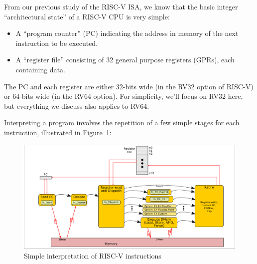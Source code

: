 \label{Sec_ISA_Exec_Algorithm}


From our previous study of the RISC-V ISA, we know that the basic
integer ``architectural state'' of a RISC-V CPU is very simple:

\begin{itemize}

\item A ``program counter'' (PC) indicating the address in memory of
the next instruction to be executed.

\item A ``register file'' consisting of 32 general purpose registers
(GPRs), each containing data.

\end{itemize}

The PC and each register are either 32-bits wide (in the RV32 option
of RISC-V) or 64-bits wide (in the RV64 option).  For simplicity,
we'll focus on RV32 here, but everything we discuss also applies to
RV64.

Interpreting a program involves the repetition of a few simple stages
for each instruction, illustrated in Figure~\ref{Fig_Instr_Exec}:
\begin{figure}[htbp]
  \centerline{\includegraphics[width=6in,angle=0]{Figures/Fig_Instr_Exec}}
  \caption{\label{Fig_Instr_Exec}Simple interpretation of RISC-V instructions}
\end{figure}

